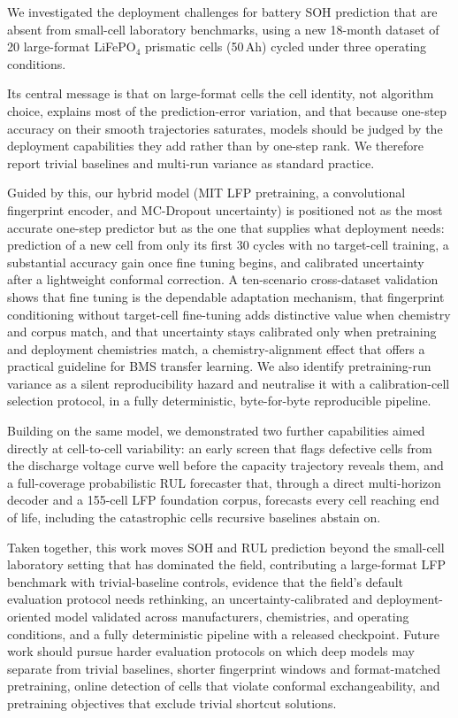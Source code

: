 We investigated the deployment challenges for battery SOH prediction that are
absent from small-cell laboratory benchmarks, using a new 18-month dataset of 20
large-format LiFePO$_4$ prismatic cells (50\,Ah) cycled under three operating
conditions.

Its central message is that on large-format cells the cell identity, not
algorithm choice, explains most of the prediction-error variation, and that
because one-step accuracy on their smooth trajectories saturates, models should
be judged by the deployment capabilities they add rather than by one-step rank.
We therefore report trivial
baselines and multi-run variance as standard practice.

Guided by this, our hybrid model (MIT LFP pretraining, a convolutional
fingerprint encoder, and MC-Dropout uncertainty) is positioned not as the most
accurate one-step predictor but as the one that supplies what deployment needs:
prediction of a new cell from only its first 30 cycles with no target-cell
training, a substantial accuracy gain once fine tuning begins, and calibrated
uncertainty after a lightweight conformal correction. A ten-scenario
cross-dataset validation shows that fine tuning is the dependable adaptation
mechanism, that fingerprint conditioning without target-cell fine-tuning adds
distinctive value when chemistry and corpus match, and that uncertainty stays
calibrated only when pretraining and deployment chemistries match, a
chemistry-alignment effect that offers a practical guideline for BMS transfer
learning. We also
identify pretraining-run variance as a silent reproducibility hazard and
neutralise it with a calibration-cell selection protocol, in a fully
deterministic, byte-for-byte reproducible pipeline.

Building on the same model, we demonstrated two further capabilities aimed
directly at cell-to-cell variability: an early screen that flags defective cells
from the discharge voltage curve well before the capacity trajectory reveals
them, and a full-coverage probabilistic RUL forecaster that, through a direct
multi-horizon decoder and a 155-cell LFP foundation corpus, forecasts every cell
reaching end of life, including the catastrophic cells recursive baselines
abstain on.

Taken together, this work moves SOH and RUL prediction beyond the small-cell
laboratory setting that has dominated the field, contributing a large-format LFP
benchmark with trivial-baseline controls, evidence that the field's default
evaluation protocol needs rethinking, an uncertainty-calibrated and
deployment-oriented model validated across manufacturers, chemistries, and
operating conditions, and a fully deterministic pipeline with a released
checkpoint. Future work should pursue harder evaluation protocols on which deep
models may separate from trivial baselines, shorter fingerprint windows and
format-matched pretraining, online detection of cells that violate conformal
exchangeability, and pretraining objectives that exclude trivial shortcut
solutions.
